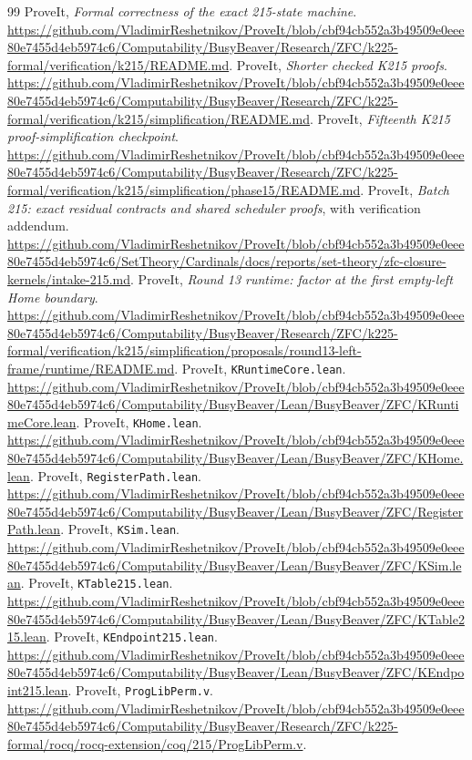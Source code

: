 \begin{thebibliography}{99}\small{}
 ProveIt, \emph{Formal correctness of the exact 215-state machine}.
\url{https://github.com/VladimirReshetnikov/ProveIt/blob/cbf94cb552a3b49509e0eee80e7455d4eb5974c6/Computability/BusyBeaver/Research/ZFC/k225-formal/verification/k215/README.md}.
 ProveIt, \emph{Shorter checked K215 proofs}.
\url{https://github.com/VladimirReshetnikov/ProveIt/blob/cbf94cb552a3b49509e0eee80e7455d4eb5974c6/Computability/BusyBeaver/Research/ZFC/k225-formal/verification/k215/simplification/README.md}.
 ProveIt, \emph{Fifteenth K215 proof-simplification checkpoint}.
\url{https://github.com/VladimirReshetnikov/ProveIt/blob/cbf94cb552a3b49509e0eee80e7455d4eb5974c6/Computability/BusyBeaver/Research/ZFC/k225-formal/verification/k215/simplification/phase15/README.md}.
 ProveIt, \emph{Batch 215: exact residual contracts and shared scheduler proofs}, with verification addendum.
\url{https://github.com/VladimirReshetnikov/ProveIt/blob/cbf94cb552a3b49509e0eee80e7455d4eb5974c6/SetTheory/Cardinals/docs/reports/set-theory/zfc-closure-kernels/intake-215.md}.
 ProveIt, \emph{Round 13 runtime: factor at the first empty-left Home boundary}.
\url{https://github.com/VladimirReshetnikov/ProveIt/blob/cbf94cb552a3b49509e0eee80e7455d4eb5974c6/Computability/BusyBeaver/Research/ZFC/k225-formal/verification/k215/simplification/proposals/round13-left-frame/runtime/README.md}.
 ProveIt, \texttt{KRuntimeCore.lean}.
\url{https://github.com/VladimirReshetnikov/ProveIt/blob/cbf94cb552a3b49509e0eee80e7455d4eb5974c6/Computability/BusyBeaver/Lean/BusyBeaver/ZFC/KRuntimeCore.lean}.
 ProveIt, \texttt{KHome.lean}.
\url{https://github.com/VladimirReshetnikov/ProveIt/blob/cbf94cb552a3b49509e0eee80e7455d4eb5974c6/Computability/BusyBeaver/Lean/BusyBeaver/ZFC/KHome.lean}.
 ProveIt, \texttt{RegisterPath.lean}.
\url{https://github.com/VladimirReshetnikov/ProveIt/blob/cbf94cb552a3b49509e0eee80e7455d4eb5974c6/Computability/BusyBeaver/Lean/BusyBeaver/ZFC/RegisterPath.lean}.
 ProveIt, \texttt{KSim.lean}.
\url{https://github.com/VladimirReshetnikov/ProveIt/blob/cbf94cb552a3b49509e0eee80e7455d4eb5974c6/Computability/BusyBeaver/Lean/BusyBeaver/ZFC/KSim.lean}.
 ProveIt, \texttt{KTable215.lean}.
\url{https://github.com/VladimirReshetnikov/ProveIt/blob/cbf94cb552a3b49509e0eee80e7455d4eb5974c6/Computability/BusyBeaver/Lean/BusyBeaver/ZFC/KTable215.lean}.
 ProveIt, \texttt{KEndpoint215.lean}.
\url{https://github.com/VladimirReshetnikov/ProveIt/blob/cbf94cb552a3b49509e0eee80e7455d4eb5974c6/Computability/BusyBeaver/Lean/BusyBeaver/ZFC/KEndpoint215.lean}.
 ProveIt, \texttt{ProgLibPerm.v}.
\url{https://github.com/VladimirReshetnikov/ProveIt/blob/cbf94cb552a3b49509e0eee80e7455d4eb5974c6/Computability/BusyBeaver/Research/ZFC/k225-formal/rocq/rocq-extension/coq/215/ProgLibPerm.v}.
\end{thebibliography}
